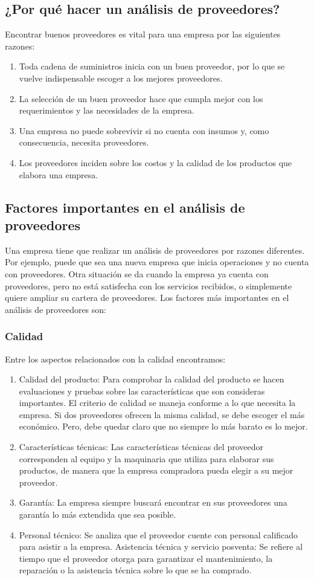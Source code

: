 \documentclass[../main]{subfiles}
\begin{document}
\subsection{¿Por qué hacer un análisis de proveedores?}
Encontrar buenos proveedores es vital para una empresa por las
siguientes razones:
\begin{enumerate}
  \item Toda cadena de suministros inicia con un buen proveedor, por
    lo que se vuelve indispensable escoger a los mejores proveedores.
  \item La selección de un buen proveedor hace que cumpla mejor con
    los requerimientos y las necesidades de la empresa.
  \item Una empresa no puede sobrevivir si no cuenta con insumos y,
    como consecuencia, necesita proveedores.
  \item Los proveedores inciden sobre los costos y la calidad de los
    productos que elabora una empresa.
\end{enumerate}
\subsection{Factores importantes en el análisis de proveedores}
Una empresa tiene que realizar un análisis de proveedores por razones
diferentes. Por ejemplo, puede que sea una nueva empresa que inicia
operaciones y no cuenta con proveedores. Otra situación se da cuando
la empresa ya cuenta con proveedores, pero no está satisfecha con los
servicios recibidos, o simplemente quiere ampliar su cartera de proveedores.
Los factores más importantes en el análisis de proveedores son:
\subsubsection{Calidad}
Entre los aspectos relacionados con la calidad encontramos:
\begin{enumerate}
  \item Calidad del producto: Para comprobar la calidad del producto
    se hacen evaluaciones y pruebas sobre las características que son
    consideras importantes. El criterio de calidad se maneja conforme
    a lo que necesita la empresa. Si dos proveedores ofrecen la misma
    calidad, se debe escoger el más económico. Pero, debe quedar
    claro que no siempre lo más barato es lo mejor.
  \item Características técnicas: Las características técnicas del
    proveedor corresponden al equipo y la maquinaria que utiliza para
    elaborar sus productos, de manera que la empresa compradora pueda
    elegir a su mejor proveedor.
  \item Garantía: La empresa siempre buscará encontrar en sus
    proveedores una garantía lo más extendida que sea posible.
  \item Personal técnico: Se analiza que el proveedor cuente con
    personal calificado para asistir a la empresa.
    Asistencia técnica y servicio posventa: Se refiere al tiempo que
    el proveedor otorga para garantizar el mantenimiento, la
    reparación o la asistencia técnica sobre lo que se ha comprado.
\end{enumerate}
\end{document}
